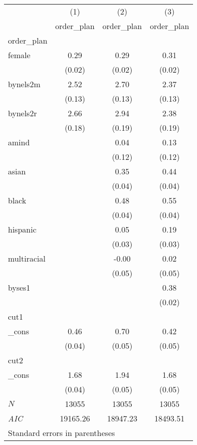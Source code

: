 \begin{tabular}{l*{3}{c}} \hline\hline
            &\multicolumn{1}{c}{(1)}&\multicolumn{1}{c}{(2)}&\multicolumn{1}{c}{(3)}\\
            &\multicolumn{1}{c}{order\_plan}&\multicolumn{1}{c}{order\_plan}&\multicolumn{1}{c}{order\_plan}\\
\hline
order\_plan  &            &            &            \\
female      &        0.29&        0.29&        0.31\\
            &      (0.02)&      (0.02)&      (0.02)\\
[1em]
bynels2m    &        2.52&        2.70&        2.37\\
            &      (0.13)&      (0.13)&      (0.13)\\
[1em]
bynels2r    &        2.66&        2.94&        2.38\\
            &      (0.18)&      (0.19)&      (0.19)\\
[1em]
amind       &            &        0.04&        0.13\\
            &            &      (0.12)&      (0.12)\\
[1em]
asian       &            &        0.35&        0.44\\
            &            &      (0.04)&      (0.04)\\
[1em]
black       &            &        0.48&        0.55\\
            &            &      (0.04)&      (0.04)\\
[1em]
hispanic    &            &        0.05&        0.19\\
            &            &      (0.03)&      (0.03)\\
[1em]
multiracial &            &       -0.00&        0.02\\
            &            &      (0.05)&      (0.05)\\
[1em]
byses1      &            &            &        0.38\\
            &            &            &      (0.02)\\
\hline
cut1        &            &            &            \\
\_cons      &        0.46&        0.70&        0.42\\
            &      (0.04)&      (0.05)&      (0.05)\\
\hline
cut2        &            &            &            \\
\_cons      &        1.68&        1.94&        1.68\\
            &      (0.04)&      (0.05)&      (0.05)\\
\hline
\(N\)       &       13055&       13055&       13055\\
\textit{AIC}&    19165.26&    18947.23&    18493.51\\
\hline\hline
\multicolumn{4}{l}{\footnotesize Standard errors in parentheses}\\
\end{tabular}
